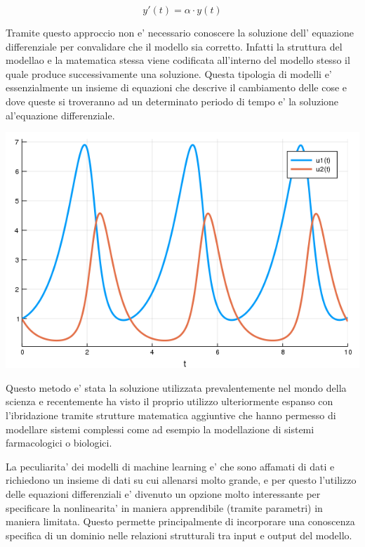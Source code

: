 $$y'(t) = \alpha \cdot y(t)$$

Tramite questo approccio non e' necessario conoscere la soluzione dell'
equazione differenziale per convalidare che il modello sia corretto. Infatti 
la struttura del modellao e la matematica stessa viene codificata all'interno 
del modello stesso  il quale produce successivamente una soluzione. Questa 
tipologia di modelli e' essenzialmente un insieme di equazioni che descrive 
il cambiamento delle cose e dove queste si troveranno ad un determinato periodo di tempo
e' la soluzione al'equazione differenziale.

\begin{minipage}{\linewidth}
    \centering
    \includegraphics[width=\textwidth]{img/lotkavolterra.png}
    \label{fig:lotkavolterra_example}
\end{minipage}

Questo metodo e' stata la soluzione utilizzata prevalentemente nel mondo 
della scienza e recentemente ha visto il proprio utilizzo ulteriormente 
espanso con l'ibridazione tramite strutture matematica aggiuntive che 
hanno permesso di modellare sistemi complessi come ad esempio la modellazione 
di sistemi farmacologici o biologici.

La peculiarita' dei modelli di machine learning e' che sono affamati di dati 
e richiedono un insieme di dati su cui allenarsi molto grande, e per questo 
l'utilizzo delle equazioni differenziali e' divenuto un opzione molto 
interessante per specificare la nonlinearita' in maniera apprendibile
(tramite parametri) in maniera limitata. Questo permette principalmente di 
incorporare una conoscenza specifica di un dominio nelle relazioni strutturali 
tra input e output del modello. 


